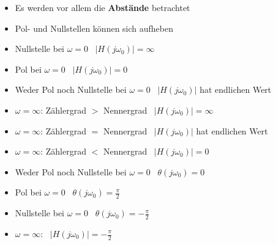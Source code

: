 \begin{itemize}
    \item Es werden vor allem die \textbf{Abstände} betrachtet 
    \item Pol- und Nullstellen können sich aufheben
    \item Nullstelle bei $\omega = 0$ \textrightarrow\ $|H(j \omega_0)| = \infty$ %
    \item Pol bei $\omega = 0$ \textrightarrow\ $|H(j \omega_0)| = 0$ %
    \item Weder Pol noch Nullstelle bei $\omega = 0$ \textrightarrow\ $|H(j \omega_0)|$ hat endlichen Wert
    \item $\omega = \infty$: Zählergrad $>$ Nennergrad \textrightarrow\ $|H(j \omega_0)| = \infty$
    \item $\omega = \infty$: Zählergrad $=$ Nennergrad \textrightarrow\ $|H(j \omega_0)|$ hat endlichen Wert
    \item $\omega = \infty$: Zählergrad $<$ Nennergrad \textrightarrow\ $|H(j \omega_0)| = 0$
    \item Weder Pol noch Nullstelle bei $\omega = 0$ \textrightarrow\ $\theta(j \omega_0) = 0$
    \item Pol bei $\omega = 0$ \textrightarrow\ $\theta(j \omega_0) = \frac{\pi}{2}$
    \item Nullstelle bei $\omega = 0$ \textrightarrow\ $\theta(j \omega_0) = -\frac{\pi}{2}$
    \item $\omega = \infty$: \textrightarrow\ $|H(j \omega_0)| = -\frac{\pi}{2}$
\end{itemize}








